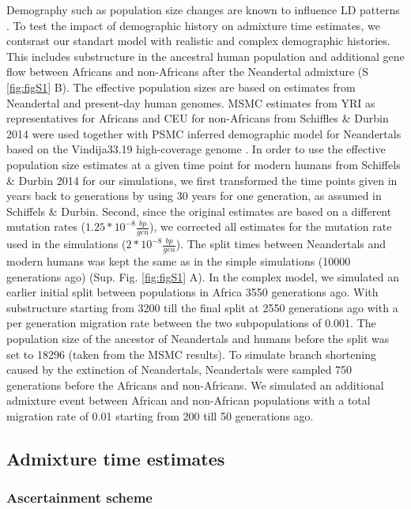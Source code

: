\documentclass[]{article}
\begin{document}
Demography such as population size changes are known to influence LD
patterns \citep{gravel_population_2012,liang_lengths_2014}. To test the impact of
demographic history on admixture time estimates, we contsrast our standart model with
realistic and complex demographic histories. This includes substructure in the ancestral human population and additional gene flow between Africans and non-Africans after the Neandertal admixture (S \ref{fig:figS1} B). The 
effective population
sizes are based on estimates from Neandertal and present-day human
genomes. MSMC estimates from YRI as representatives for Africans and CEU
for non-Africans from Schiffles \& Durbin 2014
\citep{schiffels_inferring_2014} were used together with PSMC
\citep{li_inference_2011} inferred demographic model for Neandertals
based on the Vindija33.19 high-coverage genome
\citep{mafessoni_high_coverage_2020}. In order to use the effective
population size estimates at a given time point for modern humans from
Schiffels \& Durbin 2014 for our simulations, we
first transformed the time points given in years back to generations by
using 30 years for one generation, as assumed in Schiffels \& Durbin.
Second, since the original estimates are based on a different mutation
rates (\(1.25*10^{-8} \frac{bp}{gen}\)), we corrected all estimates for
the mutation rate used in the simulations
(\(2*10^{-8} \frac{bp}{gen}\)). The split times between Neandertals and
modern humans was kept the
same as in the simple simulations (10000 generations ago) (Sup. Fig. \ref{fig:figS1} A). In the complex model, we simulated an earlier initial split between populations in Africa 3550 generations ago. With substructure starting from 3200 till the final split at 2550 generations ago with a per generation migration rate between the two subpopulations of 0.001. The population size of the ancestor of Neandertals and
humans before the split was set to 18296 (taken from the MSMC results). To simulate branch shortening
caused by the extinction of Neandertals, Neandertals were sampled 750
generations before the Africans and non-Africans. We simulated an additional admixture event between African and non-African populations with a total migration rate of 0.01 starting from 200 till 50 generations ago.

\subsection{Admixture time estimates}\label{admixture time estimates}

\subsubsection{Ascertainment scheme}\label{asceteinment scheme}
\end{document}
